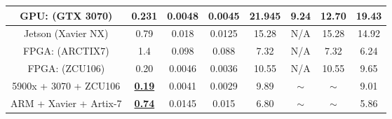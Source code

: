 \begin{table}[]
{\begin{tabular}{c|c|c|c|c|c|c|c}
\midrule
GPU: (GTX 3070) & 0.231 & 0.0048 & 0.0045 & 21.945 & 9.24 & 12.70 & 19.43 \\ 
\midrule
Jetson (Xavier NX) & 0.79 & 0.018 & 0.0125 & 15.28 & N/A & 15.28 & 14.92 \\ 
\midrule
FPGA: (ARCTIX7) & 1.4 & 0.098 & 0.088 & 7.32 & N/A & 7.32 & 6.24 \\ 
\midrule
FPGA: (ZCU106) & 0.20 & 0.0046 & 0.0036 & 10.55 & N/A & 10.55 & 9.65 \\ 
\midrule
\rowcolor[rgb]{0.898,0.898,0.898} 5900x + 3070 + ZCU106 & \textbf{\uline{0.19}} & 0.0041 & 0.0029 & 9.89 & $\sim$ & $\sim$ & 9.01 \\ 
\midrule
\rowcolor[rgb]{0.898,0.898,0.898} ARM + Xavier +   Artix-7 & \textbf{\uline{0.74}} & 0.0145 & 0.015 & 6.80 & $\sim$ & $\sim$ & 5.86 \\
\bottomrule
\end{tabular}
}
\end{table}